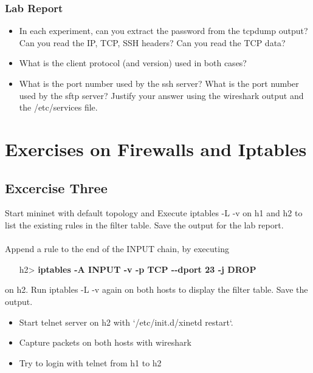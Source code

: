 \documentclass[10pt,a4paper]{article}
\numberwithin{equation}{section}
\numberwithin{figure}{section}
\numberwithin{table}{section}
\begin{document}
\subsubsection*{ Lab Report}
\begin{itemize}
	\setlength{\itemindent}{0pt}
	\item In each experiment, can you extract the password from the tcpdump output? Can you read the IP, TCP, SSH headers? Can you read the TCP data?
	\item What is the client protocol (and version) used in both cases?
	\item What is the port number used by the ssh server? What is the port number used by the sftp server? Justify your answer using the wireshark output and the /etc/services file.
\end{itemize}

    \pagebreak

\section{Exercises on Firewalls and Iptables}
\subsection*{Excercise Three}
Start mininet with default topology and Execute iptables -L -v on h1 and h2 to list the existing rules in the filter table. Save the output for the lab report.\\
\\
 Append a rule to the end of the INPUT chain, by executing

\begin{itemize}
	\setlength{\itemindent}{10pt}
	\item [h2>] \textbf{iptables -A INPUT -v -p TCP {-}{-}dport 23 -j DROP} 
\end{itemize}

\setlength{\parindent}{0pt}
on h2. Run iptables -L -v again on both hosts to display the filter table. Save the output.\\


\begin{itemize}
	\setlength{\itemindent}{0pt}
	\item Start telnet server on h2 with `/etc/init.d/xinetd restart`.
	\item Capture packets on both hosts with wireshark
	\item Try to login with telnet from h1 to h2
\end{itemize}
\end{document}
